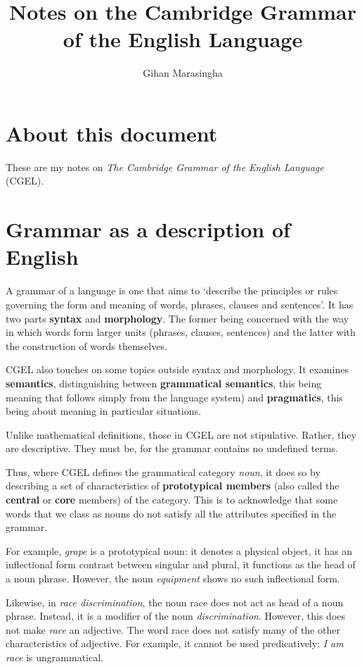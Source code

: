\documentclass{scrarticle}
\begin{document}
\title{Notes on the Cambridge Grammar of the English Language} \author{Gihan Marasingha}

\maketitle

\section{About this document}

These are my notes on \emph{The Cambridge Grammar of the English Language} (CGEL).

\section{Grammar as a description of English}

A grammar of a language is one that aims to `describe the principles or rules governing the form and
meaning of words, phrases, clauses and sentences'. It has two parts \textbf{syntax} and
\textbf{morphology}. The former being concerned with the way in which words form larger units
(phrases, clauses, sentences) and the latter with the construction of words themselves.

CGEL also touches on some topics outside syntax and morphology. It examines \textbf{semantics},
distinguishing between \textbf{grammatical semantics}, this being meaning that follows simply from
the language system) and \textbf{pragmatics}, this being about meaning in particular situations.

Unlike mathematical definitions, those in CGEL are not stipulative. Rather, they are descriptive.
They must be, for the grammar contains no undefined terms.


Thus, where CGEL defines the grammatical category \emph{noun}, it does so by describing a set of
characteristics of \textbf{prototypical members} (also called the \textbf{central} or \textbf{core}
members) of the category. This is to acknowledge that some words that we class as nouns do not
satisfy all the attributes specified in the grammar.

For example, \emph{grape} is a prototypical noun: it denotes a physical object, it has an
inflectional form contrast between singular and plural, it functions as the head of a noun phrase.
However, the noun \emph{equipment} shows no such inflectional form.

Likewise, in \emph{race discrimination}, the noun race does not act as head of a noun phrase. Instead, it
is a modifier of the noun \emph{discrimination}. However, this does not make \emph{race} an adjective. The
word race does not satisfy many of the other characteristics of adjective. For example, it cannot be
used predicatively: \emph{I am race} is ungrammatical.
\end{document}
